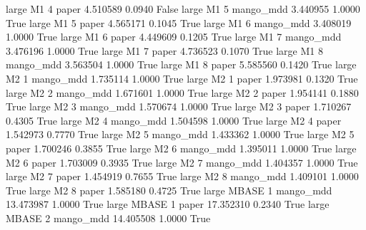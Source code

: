      large       M1                 4                 paper      4.510589      0.0940   False
     large       M1                 5             mango_mdd      3.440955      1.0000    True
     large       M1                 5                 paper      4.565171      0.1045    True
     large       M1                 6             mango_mdd      3.408019      1.0000    True
     large       M1                 6                 paper      4.449609      0.1205    True
     large       M1                 7             mango_mdd      3.476196      1.0000    True
     large       M1                 7                 paper      4.736523      0.1070    True
     large       M1                 8             mango_mdd      3.563504      1.0000    True
     large       M1                 8                 paper      5.585560      0.1420    True
     large       M2                 1             mango_mdd      1.735114      1.0000    True
     large       M2                 1                 paper      1.973981      0.1320    True
     large       M2                 2             mango_mdd      1.671601      1.0000    True
     large       M2                 2                 paper      1.954141      0.1880    True
     large       M2                 3             mango_mdd      1.570674      1.0000    True
     large       M2                 3                 paper      1.710267      0.4305    True
     large       M2                 4             mango_mdd      1.504598      1.0000    True
     large       M2                 4                 paper      1.542973      0.7770    True
     large       M2                 5             mango_mdd      1.433362      1.0000    True
     large       M2                 5                 paper      1.700246      0.3855    True
     large       M2                 6             mango_mdd      1.395011      1.0000    True
     large       M2                 6                 paper      1.703009      0.3935    True
     large       M2                 7             mango_mdd      1.404357      1.0000    True
     large       M2                 7                 paper      1.454919      0.7655    True
     large       M2                 8             mango_mdd      1.409101      1.0000    True
     large       M2                 8                 paper      1.585180      0.4725    True
     large    MBASE                 1             mango_mdd     13.473987      1.0000    True
     large    MBASE                 1                 paper     17.352310      0.2340    True
     large    MBASE                 2             mango_mdd     14.405508      1.0000    True
